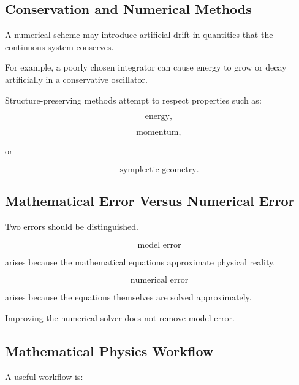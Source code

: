 \subsection{Conservation and Numerical Methods}
\label{subsec:numerical-conservation}

A numerical scheme may introduce artificial drift in quantities that the
continuous system conserves.

For example, a poorly chosen integrator can cause energy to grow or decay
artificially in a conservative oscillator.

Structure-preserving methods attempt to respect properties such as:

\[
\boxed{
\text{energy},
}
\]

\[
\boxed{
\text{momentum},
}
\]

or

\[
\boxed{
\text{symplectic geometry}.
}
\]

\subsection{Mathematical Error Versus Numerical Error}
\label{subsec:physical-model-numerical-error}

Two errors should be distinguished.

\[
\boxed{
\text{model error}
}
\]

arises because the mathematical equations approximate physical reality.

\[
\boxed{
\text{numerical error}
}
\]

arises because the equations themselves are solved approximately.

Improving the numerical solver does not remove model error.

\subsection{Mathematical Physics Workflow}
\label{subsec:mathematical-physics-workflow}

A useful workflow is:

